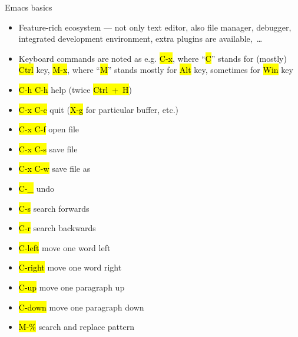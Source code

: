 \documentclass[compress, ucs, xelatex, 11pt, xcolor=svgnames,
  hyperref={
    bookmarks=true,
    unicode=true,
    colorlinks=true,
    pdftitle={Linux, command line and MetaCentrum},
    plainpages=false,
    pdfauthor={Vojtech Zeisek},
    pdfsubject={Course about use of Linux command line, writing shell scripts and using MetaCentrum of CESNET},
    pdfcreator={XeLaTeX},
    pdfkeywords={Linux, GNU, BASH, shell, command line, MetaCentrum},
    linkcolor=DarkRed,
    anchorcolor=DarkBlue,
    citecolor=Indigo,
    filecolor=NavyBlue,
    menucolor=DarkMagenta,
    urlcolor=DarkBlue,
    pdftex},
  url={hyphens, lowtilde} %
  ]{beamer}
\renewcommand{\texttt}[1]{\hl{\ttfamily #1}}
\begin{document}
\begin{frame}{Emacs basics}
  \begin{itemize}
    \item Feature-rich ecosystem --- not only text editor, also file manager, debugger, integrated development environment, extra plugins are available,~\ldots
    \item Keyboard commands are noted as e.g. \texttt{C-x}, where ``\texttt{C}'' stands for (mostly) \texttt{Ctrl} key, \texttt{M-x}, where ``\texttt{M}'' stands mostly for \texttt{Alt} key, sometimes for \texttt{Win} key
  \end{itemize}
  \begin{multicols}{2}
    \begin{itemize}
      \item \texttt{C-h C-h} help (twice \texttt{Ctrl~+~H})
      \item \texttt{C-x C-c} quit (\texttt{X-g} for particular buffer, etc.)
      \item \texttt{C-x C-f} open file
      \item \texttt{C-x C-s} save file
      \item \texttt{C-x C-w} save file as
      \item \texttt{C-\_} undo
      \item \texttt{C-s} search forwards
      \item \texttt{C-r} search backwards
      \item \texttt{C-left} move one word left
      \item \texttt{C-right} move one word right
      \item \texttt{C-up} move one paragraph up
      \item \texttt{C-down} move one paragraph down
      \item \texttt{M-\%} search and replace pattern
    \end{itemize}
  \end{multicols}
\end{frame}
\end{document}
